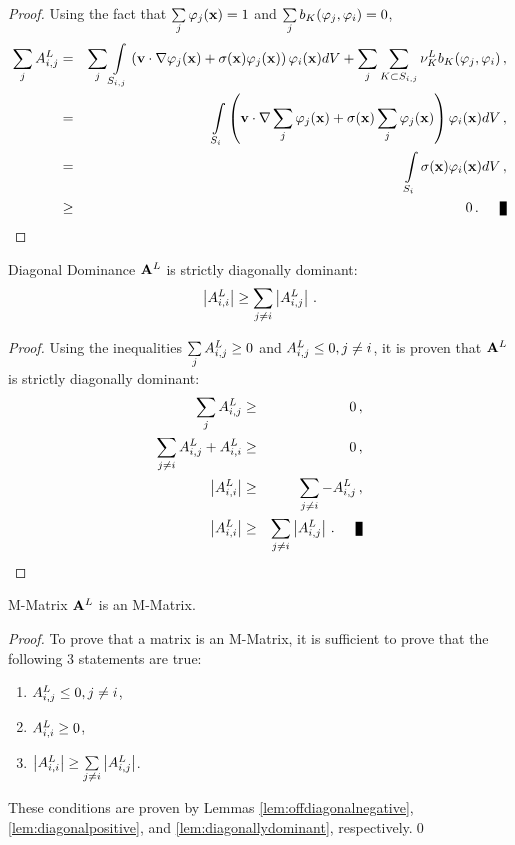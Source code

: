 \begin{proof}
Using the fact that $\sum\limits_j\varphi_j(\mathbf{x})=1$ and
$\sum\limits_j b_K(\varphi_j, \varphi_i)=0$,
\begin{eqnarray*}
   \sumj \ssmatrixletter^L\ij & = & \sumj \intSij
      \left(\velocity\cdot\nabla\testfunction_j(\x) +
      \reactioncoef(\x)\testfunction_j(\x)\right)\testfunction_i(\x) d\volume +
      \sumj\sumKSij\lowordercellviscosity \localviscbilinearform{\cell}{j}{i}
      \eqc\\
   & = & \intSi\left(\velocity\cdot
      \nabla\sumj\testfunction_j(\x) +
      \reactioncoef(\x)\sumj\testfunction_j(\x)\right)
      \testfunction_i(\x) d\volume \eqc\\
   \label{eq:rowsum} & = & \intSi\reactioncoef(\x)\testfunction_i(\x) d\volume
     \eqc\\
   &\ge& 0 \eqp \qed
\end{eqnarray*}
\end{proof}
\begin{lemma}{Diagonal Dominance}
   $\loworderssmatrix$ is strictly diagonally dominant:
   \[
     \left|A^L_{i,i}\right|
     \ge \sum\limits_{j\ne i} \left|A^L_{i,j}\right| \,.
   \]
\end{lemma}
\begin{proof}
Using the inequalities $\sum\limits_j A^L_{i,j} \ge 0$ and
$A^L_{i,j}\le 0, j\ne i$, it is proven that $\loworderssmatrix$ is
strictly diagonally dominant:
\begin{eqnarray*}
  \sumj     \ssmatrixletter^L\ij       & \ge & 0 \eqc\\
  \sumjnoti \ssmatrixletter^L\ij + \ssmatrixletter^L_{i,i} & \ge & 0 \eqc\\
  \left|\ssmatrixletter^L_{i,i}\right| & \ge & \sumjnoti -\ssmatrixletter^L\ij
    \eqc\\
  \left|\ssmatrixletter^L_{i,i}\right| & \ge
    & \sumjnoti \left|\ssmatrixletter^L\ij\right| \eqp \qed
\end{eqnarray*}
\end{proof}
\begin{lemma}{M-Matrix}
  $\loworderssmatrix$ is an M-Matrix.
\end{lemma}
\begin{proof}
To prove that a matrix is an M-Matrix, it is sufficient to prove that
the following 3 statements are true:
\begin{enumerate}
\item $A^L_{i,j}\le 0, j\ne i$,
\item $A^L_{i,i}\ge 0$,
\item $\left|A^L_{i,i}\right|
      \ge \sum\limits_{j\ne i} \left|A^L_{i,j}\right|$.
\end{enumerate}
These conditions are proven by Lemmas \ref{lem:offdiagonalnegative},
\ref{lem:diagonalpositive}, and \ref{lem:diagonallydominant}, respectively.\qed
\end{proof}
